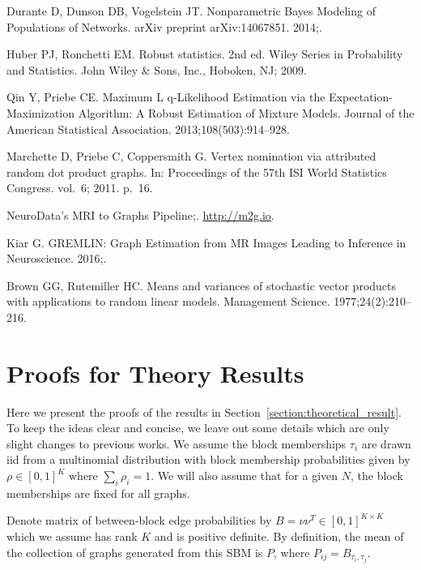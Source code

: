 \documentclass[10pt,letterpaper]{article}
\begin{document}
\begin{thebibliography}{10}
Durante D, Dunson DB, Vogelstein JT.
\newblock Nonparametric Bayes Modeling of Populations of Networks.
\newblock arXiv preprint arXiv:14067851. 2014;.

Huber PJ, Ronchetti EM.
\newblock Robust statistics.
\newblock 2nd ed. Wiley Series in Probability and Statistics. John Wiley \&
  Sons, Inc., Hoboken, NJ; 2009.

Qin Y, Priebe CE.
\newblock Maximum L q-Likelihood Estimation via the Expectation-Maximization
  Algorithm: A Robust Estimation of Mixture Models.
\newblock Journal of the American Statistical Association.
  2013;108(503):914--928.

Marchette D, Priebe C, Coppersmith G.
\newblock Vertex nomination via attributed random dot product graphs.
\newblock In: Proceedings of the 57th ISI World Statistics Congress. vol.~6;
  2011. p.~16.

NeuroData’s MRI to Graphs Pipeline;.
\newblock \url{http://m2g.io}.

Kiar G.
\newblock GREMLIN: Graph Estimation from MR Images Leading to Inference in
  Neuroscience. 2016;.

Brown GG, Rutemiller HC.
\newblock Means and variances of stochastic vector products with applications
  to random linear models.
\newblock Management Science. 1977;24(2):210--216.

\end{thebibliography}



\appendix

\section{Proofs for Theory Results}
Here we present the proofs of the results in Section~\ref{section:theoretical_result}. To keep the ideas clear and concise, we leave out some details which are only slight changes to previous works.
We assume the block memberships $\tau_i$ are drawn iid from a multinomial distribution with block membership probabilities given by $\rho\in[0,1]^K$ where $\sum_i \rho_i =1$.
We will also assume that for a given $N$, the block memberships are fixed for all graphs.

Denote matrix of between-block edge probabilities by $B = \nu \nu^T\in[0,1]^{K\times K}$ which we assume has rank $K$ and is positive definite. 
By definition, the mean of the collection of graphs generated from this SBM is $P$, where $P_{ij} = B_{\tau_i, \tau_j}$. 
\end{document}
